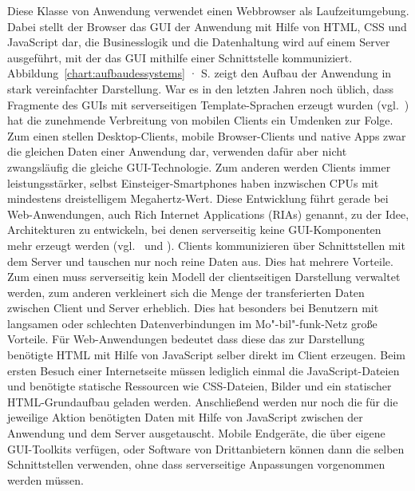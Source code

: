 Diese Klasse von Anwendung verwendet einen Webbrowser als Laufzeitumgebung. Dabei stellt der Browser das GUI der Anwendung mit Hilfe von HTML, CSS und JavaScript dar, die Businesslogik und die Datenhaltung wird auf einem Server ausgeführt, mit der das GUI mithilfe einer Schnittstelle kommuniziert. Abbildung~\ref{chart:aufbaudessystems} · S.\pageref{chart:aufbaudessystems} zeigt den Aufbau der Anwendung in stark vereinfachter Darstellung. War es in den letzten Jahren noch üblich, dass Fragmente des GUIs mit serverseitigen Template-Sprachen erzeugt wurden (vgl.~\cite[S.48]{dunkel2008systemarchitekturen}) hat die zunehmende Verbreitung von mobilen Clients ein Umdenken zur Folge. Zum einen stellen Desktop-Clients, mobile Browser-Clients und native Apps zwar die gleichen Daten einer Anwendung dar, verwenden dafür aber nicht zwangsläufig die gleiche GUI-Technologie. Zum anderen werden Clients immer leistungsstärker, selbst Einsteiger-Smartphones haben inzwischen CPUs mit mindestens dreistelligem Megahertz-Wert. Diese Entwicklung führt gerade bei Web-Anwendungen, auch Rich Internet Applications (RIAs) genannt, zu der Idee, Architekturen zu entwickeln, bei denen serverseitig keine GUI-Komponenten mehr erzeugt werden (vgl.~\cite{maccaw2011javascript} und \cite{coates2012phptemplating}). Clients kommunizieren über Schnittstellen mit dem Server und tauschen nur noch reine Daten aus. Dies hat mehrere Vorteile. Zum einen muss serverseitig kein Modell der clientseitigen Darstellung verwaltet werden, zum anderen verkleinert sich die Menge der transferierten Daten zwischen Client und Server erheblich. Dies hat besonders bei Benutzern mit langsamen oder schlechten Datenverbindungen im Mo"-bil"-funk-Netz große Vorteile. Für Web-Anwendungen bedeutet dass diese das zur Darstellung benötigte HTML mit Hilfe von JavaScript selber direkt im Client erzeugen. Beim ersten Besuch einer Internetseite müssen lediglich einmal die JavaScript-Dateien und benötigte statische Ressourcen wie CSS-Dateien, Bilder und ein statischer HTML-Grundaufbau geladen werden. Anschließend werden nur noch die für die jeweilige Aktion benötigten Daten mit Hilfe von JavaScript zwischen der Anwendung und dem Server ausgetauscht. Mobile Endgeräte, die über eigene GUI-Toolkits verfügen, oder Software von Drittanbietern können dann die selben Schnittstellen verwenden, ohne dass serverseitige Anpassungen vorgenommen werden müssen.

